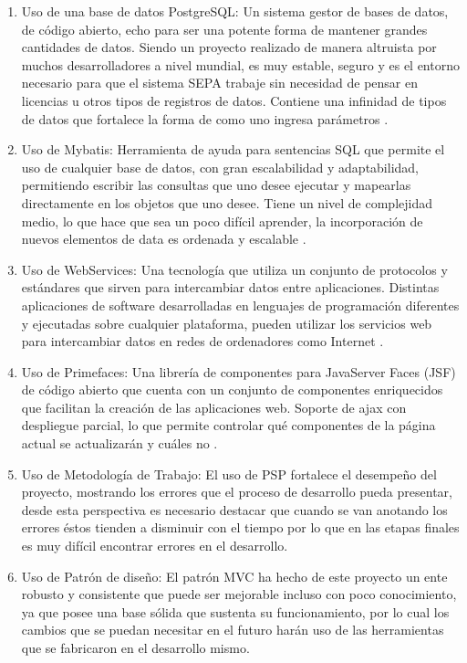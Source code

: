 \documentclass[a4paper,12pt,openany,oneside]{book}
\begin{document}
\begin{enumerate}
        \item Uso de una base de datos PostgreSQL: Un sistema gestor de bases de datos, de código abierto, echo para ser una potente forma de mantener grandes cantidades de datos. Siendo un proyecto realizado de manera altruista por muchos desarrolladores a nivel mundial, es muy estable, seguro y es el entorno necesario para que el sistema SEPA trabaje sin necesidad de pensar en licencias u otros tipos de registros de datos. Contiene una infinidad de tipos de datos que fortalece la forma de como uno ingresa parámetros \cite{data18}.
        \item Uso de Mybatis: Herramienta de ayuda para sentencias SQL que permite el uso de cualquier base de datos, con gran escalabilidad y adaptabilidad, permitiendo escribir las consultas que uno desee ejecutar y mapearlas directamente en los objetos que uno desee. Tiene un nivel de complejidad medio, lo que hace que sea un poco difícil aprender, la incorporación de nuevos elementos de data es ordenada y escalable \cite{data19}.
        \item Uso de WebServices: Una tecnología que utiliza un conjunto de protocolos y estándares que sirven para intercambiar datos entre aplicaciones. Distintas aplicaciones de software desarrolladas en lenguajes de programación diferentes y ejecutadas sobre cualquier plataforma, pueden utilizar los servicios web para intercambiar datos en redes de ordenadores como Internet \cite{data20}.
        \item Uso de Primefaces: Una librería de componentes para JavaServer Faces (JSF) de código abierto que cuenta con un conjunto de componentes enriquecidos que facilitan la creación de las aplicaciones web. Soporte de ajax con despliegue parcial, lo que permite controlar qué componentes de la página actual se actualizarán y cuáles no \cite{data21}.
        \item Uso de Metodología de Trabajo: El uso de PSP fortalece el desempeño del proyecto, mostrando los errores que el proceso de desarrollo pueda presentar, desde esta perspectiva es necesario destacar que cuando se van anotando los errores éstos tienden a disminuir con el tiempo por lo que en las etapas finales es muy difícil encontrar errores en el desarrollo.
        \item Uso de Patrón de diseño: El patrón MVC ha hecho de este proyecto un ente robusto y consistente que puede ser mejorable incluso con poco conocimiento, ya que posee una base sólida que sustenta su funcionamiento, por lo cual los cambios que se puedan necesitar en el futuro harán uso de las herramientas que se fabricaron en el desarrollo mismo.

\end{enumerate}
\end{document}
